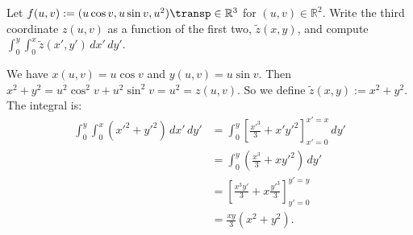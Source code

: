 \begin{example}
\label{ex:surface_parametrization_integral}
Let $f(u,v) := (u\cos v, u\sin v, u^2)\transp \in \mathbb{R}^3$ for $(u,v) \in \mathbb{R}^2$. Write the third coordinate $z(u,v)$ as a function of the first two, $\tilde{z}(x,y)$, and compute $\int_0^y \int_0^x \tilde{z}(x',y') \,dx'\,dy'$.

We have $x(u,v) = u\cos v$ and $y(u,v) = u\sin v$. Then $x^2 + y^2 = u^2\cos^2 v + u^2\sin^2 v = u^2 = z(u,v)$.
So we define $\tilde{z}(x,y) := x^2 + y^2$.
The integral is:
\begin{align}
\int_0^y \int_0^x (x'^2 + y'^2) \,dx'\,dy'
&= \int_0^y \left[ \frac{x'^3}{3} + x'y'^2 \right]_{x'=0}^{x'=x} \,dy' \nonumber \\
&= \int_0^y \left( \frac{x^3}{3} + x y'^2 \right) \,dy' \nonumber \\
&= \left[ \frac{x^3 y'}{3} + x \frac{y'^3}{3} \right]_{y'=0}^{y'=y} \nonumber \\
&= \frac{xy}{3}(x^2 + y^2). \label{eq:surface_integral_result}
\end{align}
\end{example}

